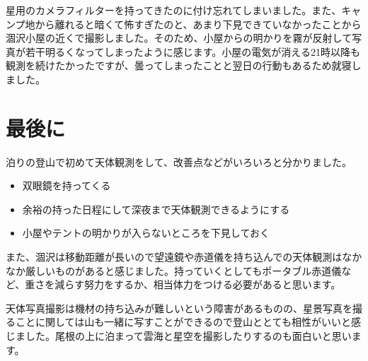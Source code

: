 \documentclass[../main]{subfiles}
\begin{document}
\vspace{0.5cm}

星用のカメラフィルターを持ってきたのに付け忘れてしまいました。また、キャンプ地から離れると暗くて怖すぎたのと、あまり下見できていなかったことから涸沢小屋の近くで撮影しました。そのため、小屋からの明かりを霧が反射して写真が若干明るくなってしまったように感じます。小屋の電気が消える21時以降も観測を続けたかったですが、曇ってしまったことと翌日の行動もあるため就寝しました。

\section{最後に}

泊りの登山で初めて天体観測をして、改善点などがいろいろと分かりました。

\begin{itemize}
  \item 双眼鏡を持ってくる
  \item 余裕の持った日程にして深夜まで天体観測できるようにする
  \item 小屋やテントの明かりが入らないところを下見しておく
\end{itemize}

また、涸沢は移動距離が長いので望遠鏡や赤道儀を持ち込んでの天体観測はなかなか厳しいものがあると感じました。持っていくとしてもポータブル赤道儀など、重さを減らす努力をするか、相当体力をつける必要があると思います。

天体写真撮影は機材の持ち込みが難しいという障害があるものの、星景写真を撮ることに関しては山も一緒に写すことができるので登山ととても相性がいいと感じました。尾根の上に泊まって雲海と星空を撮影したりするのも面白いと思います。
\end{document}
